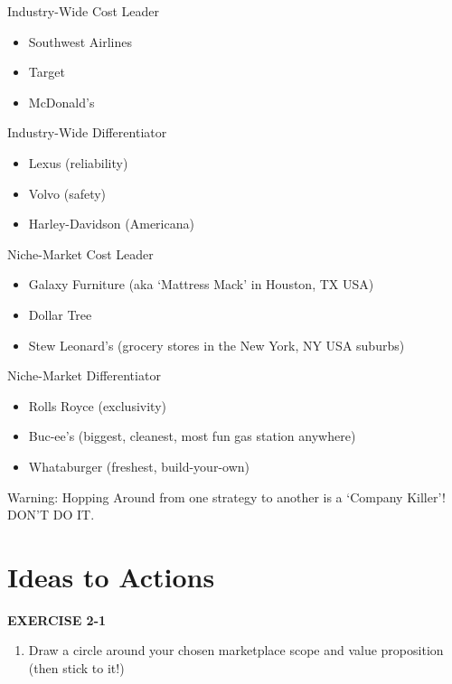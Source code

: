 \documentclass[
]{book}
\providecommand{\tightlist}{%
  \setlength{\itemsep}{0pt}\setlength{\parskip}{0pt}}
\begin{document}
{Industry-Wide} { Cost Leader}

\begin{itemize}
\item
  Southwest Airlines
\item
  Target
\item
  McDonald's
\end{itemize}

{Industry-Wide} {Differentiator}

\begin{itemize}
\item
  Lexus (reliability)
\item
  Volvo (safety)
\item
  Harley-Davidson (Americana)
\end{itemize}

{Niche-Market} { Cost Leader}

\begin{itemize}
\item
  Galaxy Furniture (aka `Mattress Mack' in Houston, TX USA)
\item
  Dollar Tree
\item
  Stew Leonard's (grocery stores in the New York, NY USA suburbs)
\end{itemize}

{Niche-Market} { Differentiator}

\begin{itemize}
\item
  Rolls Royce (exclusivity)
\item
  Buc-ee's (biggest, cleanest, most fun gas station anywhere)
\item
  Whataburger (freshest, build-your-own)
\end{itemize}

Warning: Hopping Around from one strategy to another is a `Company Killer'! DON'T DO IT.

\hypertarget{ideas-to-actions-2}{%
\section{Ideas to Actions}\label{ideas-to-actions-2}}

\textbf{EXERCISE 2-1}

\begin{enumerate}
\def\labelenumi{\arabic{enumi}.}
\tightlist
\item
  Draw a circle around your chosen marketplace scope and value proposition (then stick to it!)
\end{enumerate}
\end{document}
